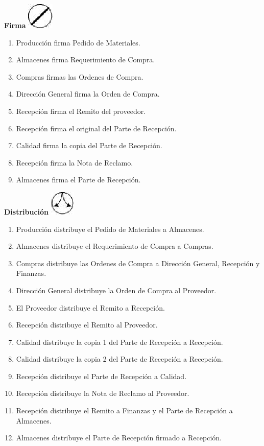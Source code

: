 \begin{center}
  \textbf{Firma}
  \includegraphics{./Images/Simbolos/simbolo-Firma.png}
\end{center}
\begin{enumerate}
  \item Producción firma Pedido de Materiales.
  \item Almacenes firma Requerimiento de Compra.
  \item Compras firmas las Ordenes de Compra.
  \item Dirección General firma la Orden de Compra.
  \item Recepción firma el Remito del proveedor.
  \item Recepción firma el original del Parte de Recepción.
  \item Calidad firma la copia del Parte de Recepción.
  \item Recepción firma la Nota de Reclamo.
  \item Almacenes firma el Parte de Recepción.
\end{enumerate}

\begin{center}
  \textbf{Distribución}
  \includegraphics{./Images/Simbolos/simbolo-Distribucion.png}
\end{center}
\begin{enumerate}
  \item Producción distribuye el Pedido de Materiales a Almacenes.
  \item Almacenes distribuye el Requerimiento de Compra a Compras.
  \item Compras distribuye las Ordenes de Compra a Dirección General, Recepción y Finanzas.
  \item Dirección General distribuye la Orden de Compra al Proveedor.
  \item El Proveedor distribuye el Remito a Recepción.
  \item Recepción distribuye el Remito al Proveedor.
  \item Calidad distribuye la copia 1 del Parte de Recepción a Recepción.
  \item Calidad distribuye la copia 2 del Parte de Recepción a Recepción.
  \item Recepción distribuye el Parte de Recepción a Calidad.
  \item Recepción distribuye la Nota de Reclamo al Proveedor.
  \item Recepción distribuye el Remito a Finanzas y el Parte de Recepción a Almacenes.
  \item Almacenes distribuye el Parte de Recepción firmado a Recepción.
\end{enumerate}

